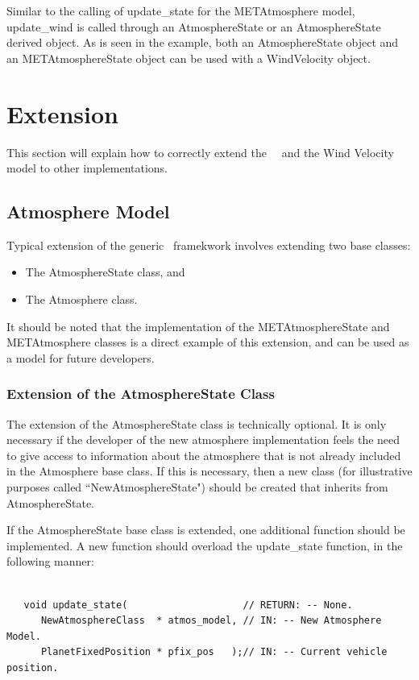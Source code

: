 Similar to the calling of update\_state for the METAtmosphere model,
update\_wind is called through an AtmosphereState or an AtmosphereState derived
object. As is seen in the example, both an AtmosphereState object and an
METAtmosphereState object can be used with a WindVelocity object.


\section{Extension}

This section will explain how to correctly extend the \JEODid\ \atmosphereDesc\
and the Wind Velocity model to other implementations.

\subsection{Atmosphere Model}

Typical extension of the generic \atmosphereDesc\ framekwork involves extending
two base classes:

\begin{itemize}
\item The AtmosphereState class, and
\item The Atmosphere class.
\end{itemize}

It should be noted that the implementation of the METAtmosphereState and
METAtmosphere classes is a direct example of this extension, and can be used
as a model for future developers.

\subsubsection{Extension of the AtmosphereState Class}

The extension of the AtmosphereState class is technically optional. It is only
necessary if the developer of the new atmosphere implementation feels the need
to give access to information about the atmosphere that is not already included
in the Atmosphere base class. If this is necessary, then a new class (for
illustrative purposes called ``NewAtmosphereState") should be created that
inherits from AtmosphereState.

If the AtmosphereState base class is extended, one additional function should be
implemented. A new function should overload the
update\_state function, in the following manner:

\begin{verbatim}

   void update_state(                    // RETURN: -- None.
      NewAtmosphereClass  * atmos_model, // IN: -- New Atmosphere Model.
      PlanetFixedPosition * pfix_pos   );// IN: -- Current vehicle position.

\end{verbatim}

